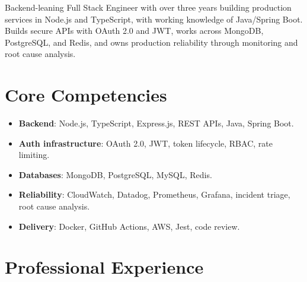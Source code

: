 \documentclass[11pt,a4paper,sans]{moderncv}
\begin{document}
\makecvtitle

\vspace{6pt}
{\small Backend-leaning Full Stack Engineer with over three years building production services in Node.js and TypeScript, with working knowledge of Java/Spring Boot. Builds secure APIs with OAuth 2.0 and JWT, works across MongoDB, PostgreSQL, and Redis, and owns production reliability through monitoring and root cause analysis.\par}

\section{Core Competencies}
\vspace{1pt}
\begin{itemize}

\item \textbf{Backend}: Node.js, TypeScript, Express.js, REST APIs, Java, Spring Boot.

\item \textbf{Auth infrastructure}: OAuth 2.0, JWT, token lifecycle, RBAC, rate limiting.

\item \textbf{Databases}: MongoDB, PostgreSQL, MySQL, Redis.

\item \textbf{Reliability}: CloudWatch, Datadog, Prometheus, Grafana, incident triage, root cause analysis.

\item \textbf{Delivery}: Docker, GitHub Actions, AWS, Jest, code review.

\end{itemize}

\section{Professional Experience}
\vspace{3pt}
\end{document}
